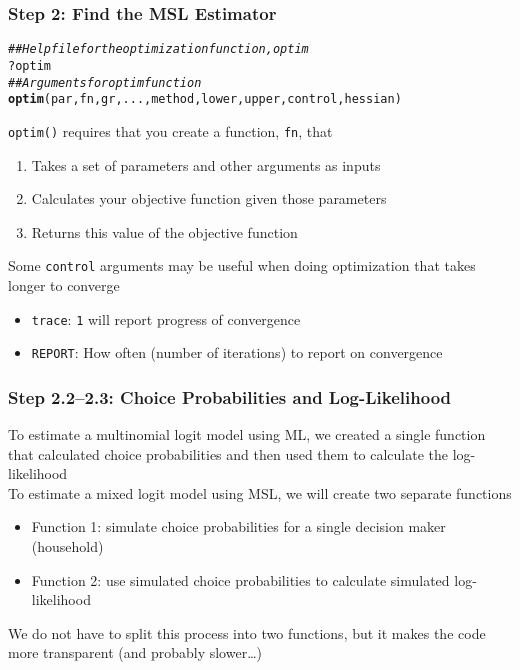 \documentclass{beamer}\usepackage[]{graphicx}\usepackage[]{xcolor}
\makeatletter
\newcommand{\hlcom}[1]{\textcolor[rgb]{0.678,0.584,0.686}{\textit{#1}}}%
\newcommand{\hlopt}[1]{\textcolor[rgb]{0,0,0}{#1}}%
\newcommand{\hlstd}[1]{\textcolor[rgb]{0.345,0.345,0.345}{#1}}%
\newcommand{\hlkwd}[1]{\textcolor[rgb]{0.737,0.353,0.396}{\textbf{#1}}}%
\newenvironment{kframe}{%
 \def\at@end@of@kframe{}%
 \ifinner\ifhmode%
  \def\at@end@of@kframe{\end{minipage}}%
  \begin{minipage}{\columnwidth}%
 \fi\fi%
 \def\FrameCommand##1{\hskip\@totalleftmargin \hskip-\fboxsep
 \colorbox{shadecolor}{##1}\hskip-\fboxsep
     \hskip-\linewidth \hskip-\@totalleftmargin \hskip\columnwidth}%
 \MakeFramed {\advance\hsize-\width
   \@totalleftmargin\z@ \linewidth\hsize
   \@setminipage}}%
 {\par\unskip\endMakeFramed%
 \at@end@of@kframe}
\newenvironment{knitrout}{}{} %
\makeatother
\begin{document}
\begin{frame}[fragile]\frametitle{Step 2: Find the MSL Estimator}
\begin{knitrout}\footnotesize
{}\color{fgcolor}\begin{kframe}
\begin{alltt}
\hlcom{## Help file for the optimization function, optim}
\hlopt{?}\hlstd{optim}
\hlcom{## Arguments for optim function}
\hlkwd{optim}\hlstd{(par, fn, gr, ..., method, lower, upper, control, hessian)}
\end{alltt}
\end{kframe}
\end{knitrout}
    \vspace{2ex}
	\texttt{optim()} requires that you create a function, \texttt{fn}, that
	\begin{enumerate}
		\item Takes a set of parameters and other arguments as inputs
		\item Calculates your objective function given those parameters
		\item Returns this value of the objective function
	\end{enumerate}
	\vspace{2ex}
	Some \texttt{control} arguments may be useful when doing optimization that takes longer to converge
	\begin{itemize}
		\item \texttt{trace}: \texttt{1} will report progress of convergence
		\item \texttt{REPORT}: How often (number of iterations) to report on convergence
	\end{itemize}
\end{frame}

\begin{frame}\frametitle{Step 2.2--2.3: Choice Probabilities and Log-Likelihood}
    To estimate a multinomial logit model using ML, we created a single function that calculated choice probabilities and then used them to calculate the log-likelihood \\
    \vspace{2ex}
    To estimate a mixed logit model using MSL, we will create two separate functions
    \begin{itemize}
    	\item Function 1: simulate choice probabilities for a single decision maker (household)
    	\item Function 2: use simulated choice probabilities to calculate simulated log-likelihood
    \end{itemize}
    \vspace{2ex}
    We do not have to split this process into two functions, but it makes the code more transparent (and probably slower\ldots)
\end{frame}
\end{document}
